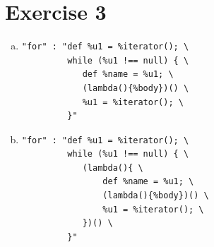 \documentclass[11pt]{article}
\begin{document}
\section*{Exercise 3}
\begin{enumerate}[(a)]
\item \begin{verbatim}
"for" : "def %u1 = %iterator(); \
         while (%u1 !== null) { \
            def %name = %u1; \
            (lambda(){%body})() \
            %u1 = %iterator(); \
         }"
\end{verbatim}
\item \begin{verbatim}
"for" : "def %u1 = %iterator(); \
         while (%u1 !== null) { \
            (lambda(){ \
                def %name = %u1; \
                (lambda(){%body})() \
                %u1 = %iterator(); \
            })() \
         }"
\end{verbatim}
\end{enumerate}
\end{document}

